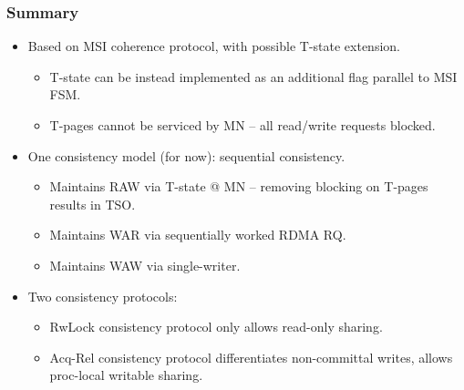 \documentclass{beamer}
\begin{document}
\begin{frame}
    \frametitle{Summary}
    \begin{itemize}
        \item {
            Based on MSI coherence protocol, with possible T-state extension.
            \begin{itemize}
                \item T-state can be instead implemented as an additional flag parallel to MSI FSM.
                \item T-pages cannot be serviced by MN -- all read/write requests blocked.
            \end{itemize}
        }
        \item {
            One consistency model (for now): sequential consistency.
            \begin{itemize}
                \item Maintains RAW via T-state @ MN -- removing blocking on T-pages results in TSO.
                \item Maintains WAR via sequentially worked RDMA RQ.
                \item Maintains WAW via single-writer.
            \end{itemize}
        }
        \item {
            Two consistency protocols:
            \begin{itemize}
                \item RwLock consistency protocol only allows read-only sharing.
                \item {
                    Acq-Rel consistency protocol differentiates non-committal writes,
                    allows proc-local writable sharing.
                }
            \end{itemize}
        }
    \end{itemize}
\end{frame}
\end{document}
